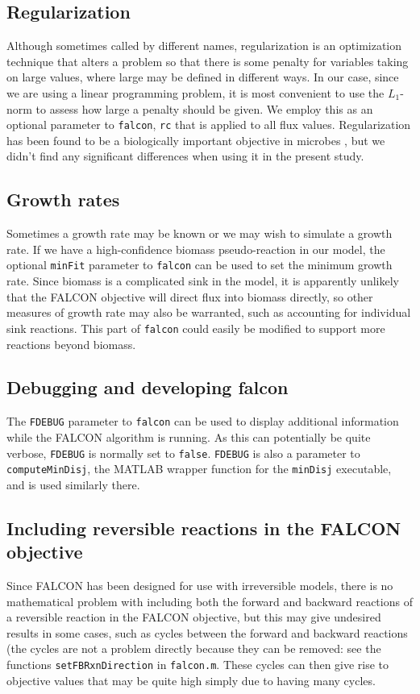 \subsection{Regularization}
Although sometimes called by different names, regularization is an
optimization technique that alters a problem so that there is some
penalty for variables taking on large values, where large may be
defined in different ways. In our case, since we are using a linear
programming problem, it is most convenient to use the $L_1$-norm to
assess how large a penalty should be given. We employ this as an
optional parameter to \texttt{falcon}, \texttt{rc} that is applied to
all flux values.  Regularization has been found to be a biologically
important objective in microbes \citep{Schuetz2012}, but we didn't
find any significant differences when using it in the present study.

\subsection{Growth rates}
Sometimes a growth rate may be known or we may wish to simulate a
growth rate. If we have a high-confidence biomass pseudo-reaction in
our model, the optional \texttt{minFit} parameter to \texttt{falcon}
can be used to set the minimum growth rate. Since biomass is a
complicated sink in the model, it is apparently unlikely that the
FALCON objective will direct flux into biomass directly, so other
measures of growth rate may also be warranted, such as accounting
for individual sink reactions. This part of \texttt{falcon} could
easily be modified to support more reactions beyond biomass.

\subsection{Debugging and developing falcon}
The \texttt{FDEBUG} parameter to \texttt{falcon} can be used to
display additional information while the FALCON algorithm is
running. As this can potentially be quite verbose, \texttt{FDEBUG} is
normally set to \texttt{false}. \texttt{FDEBUG} is also a parameter to
\texttt{computeMinDisj}, the MATLAB wrapper function for the
\texttt{minDisj} executable, and is used similarly there.


\subsection{Including reversible reactions in the FALCON objective}
Since FALCON has been designed for use with irreversible models, there
is no mathematical problem with including both the forward and
backward reactions of a reversible reaction in the FALCON objective,
but this may give undesired results in some cases, such as cycles
between the forward and backward reactions (the cycles are not a
problem directly because they can be removed: see the functions
\texttt{setFBRxnDirection} in \texttt{falcon.m}.  These cycles can
then give rise to objective values that may be quite high simply due
to having many cycles.

